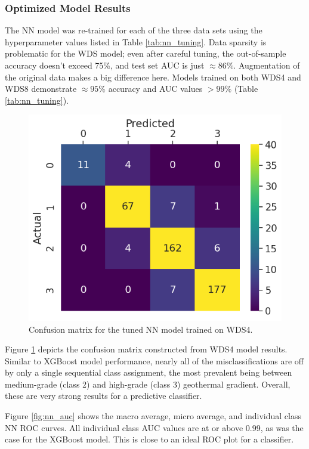 \subsubsection{Optimized Model Results}\label{ch5:nn_final_results}
The NN model was re-trained for each of the three data sets using the hyperparameter values listed in Table \ref{tab:nn_tuning}. Data sparsity is problematic for the WDS model; even after careful tuning, the out-of-sample accuracy doesn't exceed 75\%, and test set AUC is just $\approx86\%$. Augmentation of the original data makes a big difference here. Models trained on both WDS4 and WDS8 demonstrate $\approx95\%$ accuracy and AUC values $>99\%$ (Table \ref{tab:nn_tuning}).
 
\begin{figure}[htp]
\centering
\includegraphics[width=.5\textwidth]{templates/images/Figure-NN-ConfusionMatrix_WDS4.png}
\singlespacing
\caption[Neural network confusion matrix]{Confusion matrix for the tuned NN model trained on WDS4.}
\label{fig:nn_confusion_matrix}
\end{figure}

Figure \ref{fig:nn_confusion_matrix} depicts the confusion matrix constructed from WDS4 model results. Similar to XGBoost model performance, nearly all of the misclassifications are off by only a single sequential class assignment, the most prevalent being between medium-grade (class 2) and high-grade (class 3) geothermal gradient. Overall, these are very strong results for a predictive classifier.

Figure \ref{fig:nn_auc} shows the macro average, micro average, and individual class NN ROC curves. All individual class AUC values are at or above 0.99, as was the case for the XGBoost model. This is close to an ideal ROC plot for a classifier.

